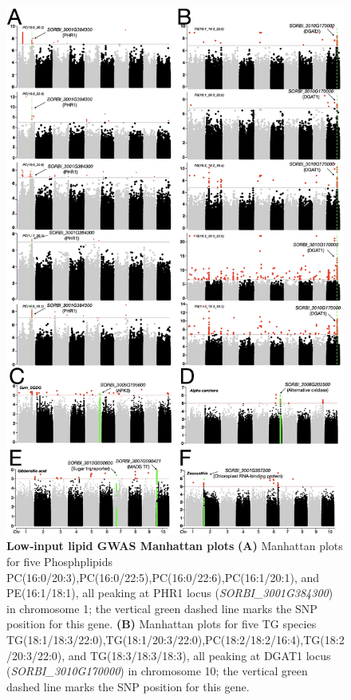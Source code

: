 \documentclass[10pt,letterpaper]{article}
\begin{document}
\begin{figure}[htbp]
  \centering
  \includegraphics[width=\textwidth]{fig/main/Fig3.png}
  \caption{\textbf{Low‐input lipid GWAS Manhattan plots}
    \textbf{(A)} Manhattan plots for five Phosphplipids PC(16:0/20:3),PC(16:0/22:5),PC(16:0/22:6),PC(16:1/20:1), and PE(16:1/18:1), all peaking at PHR1 locus (\textit{SORBI\_3001G384300}) in chromosome 1; the vertical green dashed line marks the SNP position for this gene.  
    \textbf{(B)} Manhattan plots for five TG species TG(18:1/18:3/22:0),TG(18:1/20:3/22:0),PC(18:2/18:2/16:4),TG(18:2/20:3/22:0), and TG(18:3/18:3/18:3), all peaking at DGAT1 locus (\textit{SORBI\_3010G170000}) in chromosome 10; the vertical green dashed line marks the SNP position for this gene. 
}
\end{figure}
\end{document}

